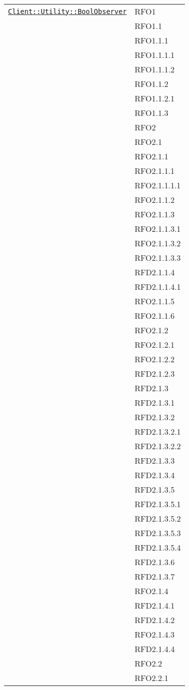 \begin{longtable}{|>{\centering}m{10cm}|m{3cm}<{\centering}|}
\hyperref[Client::Utility::BoolObserver]{\texttt{Client::Utility::BoolObserver}} & RFO1\\
& RFO1.1\\
& RFO1.1.1\\
& RFO1.1.1.1\\
& RFO1.1.1.2\\
& RFO1.1.2\\
& RFO1.1.2.1\\
& RFO1.1.3\\
& RFO2\\
& RFO2.1\\
& RFO2.1.1\\
& RFO2.1.1.1\\
& RFO2.1.1.1.1\\
& RFO2.1.1.2\\
& RFO2.1.1.3\\
& RFO2.1.1.3.1\\
& RFO2.1.1.3.2\\
& RFO2.1.1.3.3\\
& RFD2.1.1.4\\
& RFD2.1.1.4.1\\
& RFO2.1.1.5\\
& RFO2.1.1.6\\
& RFO2.1.2\\
& RFO2.1.2.1\\
& RFO2.1.2.2\\
& RFD2.1.2.3\\
& RFD2.1.3\\
& RFD2.1.3.1\\
& RFD2.1.3.2\\
& RFD2.1.3.2.1\\
& RFD2.1.3.2.2\\
& RFD2.1.3.3\\
& RFD2.1.3.4\\
& RFD2.1.3.5\\
& RFD2.1.3.5.1\\
& RFD2.1.3.5.2\\
& RFD2.1.3.5.3\\
& RFD2.1.3.5.4\\
& RFD2.1.3.6\\
& RFD2.1.3.7\\
& RFO2.1.4\\
& RFD2.1.4.1\\
& RFD2.1.4.2\\
& RFO2.1.4.3\\
& RFD2.1.4.4\\
& RFO2.2\\
& RFO2.2.1\\

\end{longtable}
